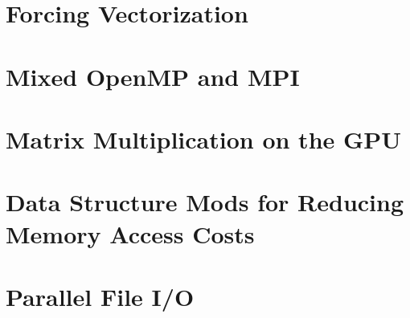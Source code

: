 \documentclass{softwaremanual}
\begin{document}
\section{Forcing Vectorization}

\section{Mixed OpenMP and MPI}

\section{Matrix Multiplication on the GPU}

\section{Data Structure Mods for Reducing Memory Access Costs}

\section{Parallel File I/O}



\clearpage


\pagebreak



\end{document}
